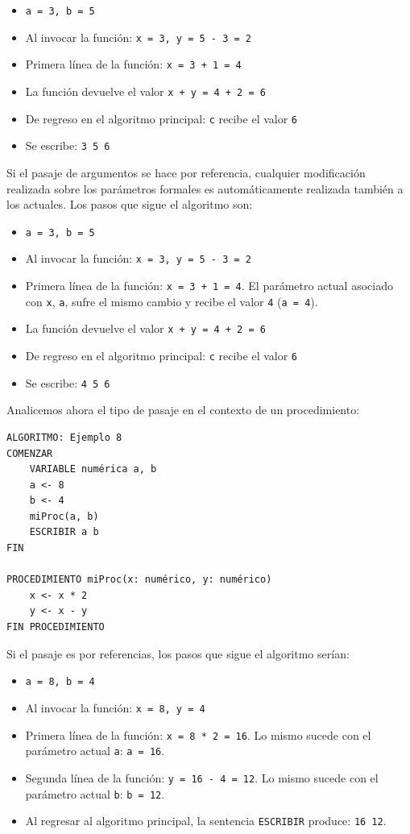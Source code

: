 \documentclass[]{book}
\providecommand{\tightlist}{%
  \setlength{\itemsep}{0pt}\setlength{\parskip}{0pt}}
\begin{document}
\begin{itemize}
\tightlist
\item
  \texttt{a\ =\ 3,\ b\ =\ 5}
\item
  Al invocar la función: \texttt{x\ =\ 3,\ y\ =\ 5\ -\ 3\ =\ 2}
\item
  Primera línea de la función: \texttt{x\ =\ 3\ +\ 1\ =\ 4}
\item
  La función devuelve el valor \texttt{x\ +\ y\ =\ 4\ +\ 2\ =\ 6}
\item
  De regreso en el algoritmo principal: \texttt{c} recibe el valor
  \texttt{6}
\item
  Se escribe: \texttt{3\ 5\ 6}
\end{itemize}

Si el pasaje de argumentos se hace por referencia, cualquier
modificación realizada sobre los parámetros formales es automáticamente
realizada también a los actuales. Los pasos que sigue el algoritmo son:

\begin{itemize}
\tightlist
\item
  \texttt{a\ =\ 3,\ b\ =\ 5}
\item
  Al invocar la función: \texttt{x\ =\ 3,\ y\ =\ 5\ -\ 3\ =\ 2}
\item
  Primera línea de la función: \texttt{x\ =\ 3\ +\ 1\ =\ 4}. El
  parámetro actual asociado con \texttt{x}, \texttt{a}, sufre el mismo
  cambio y recibe el valor \texttt{4} (\texttt{a\ =\ 4}).
\item
  La función devuelve el valor \texttt{x\ +\ y\ =\ 4\ +\ 2\ =\ 6}
\item
  De regreso en el algoritmo principal: \texttt{c} recibe el valor
  \texttt{6}
\item
  Se escribe: \texttt{4\ 5\ 6}
\end{itemize}

Analicemos ahora el tipo de pasaje en el contexto de un procedimiento:

\begin{verbatim}
ALGORITMO: Ejemplo 8
COMENZAR
    VARIABLE numérica a, b
    a <- 8
    b <- 4
    miProc(a, b)
    ESCRIBIR a b
FIN

PROCEDIMIENTO miProc(x: numérico, y: numérico)
    x <- x * 2
    y <- x - y
FIN PROCEDIMIENTO
\end{verbatim}

Si el pasaje es por referencias, los pasos que sigue el algoritmo
serían:

\begin{itemize}
\tightlist
\item
  \texttt{a\ =\ 8,\ b\ =\ 4}
\item
  Al invocar la función: \texttt{x\ =\ 8,\ y\ =\ 4}
\item
  Primera línea de la función: \texttt{x\ =\ 8\ *\ 2\ =\ 16}. Lo mismo
  sucede con el parámetro actual \texttt{a}: \texttt{a\ =\ 16}.
\item
  Segunda línea de la función: \texttt{y\ =\ 16\ -\ 4\ =\ 12}. Lo mismo
  sucede con el parámetro actual \texttt{b}: \texttt{b\ =\ 12}.
\item
  Al regresar al algoritmo principal, la sentencia \texttt{ESCRIBIR}
  produce: \texttt{16\ 12}.
\end{itemize}
\end{document}
